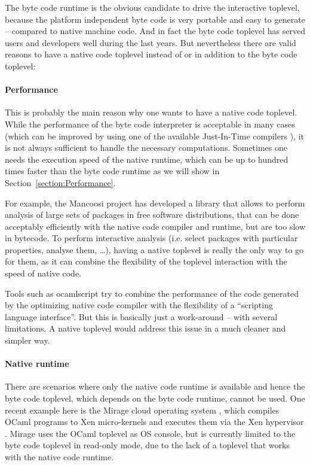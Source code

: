 \documentclass[10pt,a4paper,final,twocolumn]{article}
\makeatletter
\newcommand{\ie}{i.e.\@\xspace}
\makeatother
\begin{document}
The byte code runtime is the obvious candidate to drive the interactive toplevel, because the platform
independent byte code is very portable and easy to generate -- compared to native machine code. And in
fact the byte code toplevel has served users and developers well during the last years. But nevertheless
there are valid reasons to have a native code toplevel instead of or in addition to the byte code toplevel:

\paragraph{Performance}

This is probably the main reason why one wants to have a native code toplevel. While the performance of
the byte code interpreter is acceptable in many cases (which can be improved by using one of the
available Just-In-Time compilers \cite{Meurer10ocamljit,Meurer10jit,Meurer11ocamljit2,Starynkevitch04}),
it is not always sufficient to handle the necessary computations. Sometimes one needs the execution
speed of the native runtime, which can be up to hundred times faster than the byte code runtime as we will
show in Section~\ref{section:Performance}.

For example, the Mancoosi project \cite{Mancoosi11} has developed a library that allows to perform analysis
of large sets of packages in free software distributions, that can be done acceptably efficiently with the
native code compiler and runtime, but are too slow in bytecode. To perform interactive analysis (\ie select
packages with particular properties, analyse them, \ldots), having a native toplevel is really the only way
to go for them, as it can combine the flexibility of the toplevel interaction with the speed of native code.

Tools such as ocamlscript \cite{ocamlscript11} try to combine the performance of the code generated by
the optimizing native code compiler with the flexibility of a ``scripting language interface''. But this
is basically just a work-around -- with several limitations. A native toplevel would address this issue in
a much cleaner and simpler way.

\paragraph{Native runtime}

There are scenarios where only the native code runtime is available and hence the byte code toplevel,
which depends on the byte code runtime, cannot be used. One recent example here is the Mirage cloud
operating system \cite{Mirage11,Madhavapeddy10,Madhavapeddy10hotcloud}, which compiles OCaml programs
to Xen micro-kernels \cite{Barham03} and executes them via the Xen hypervisor \cite{Xen11}. Mirage
uses the OCaml toplevel as OS console, but is currently limited to the byte code toplevel in read-only
mode, due to the lack of a toplevel that works with the native code runtime.
\end{document}
